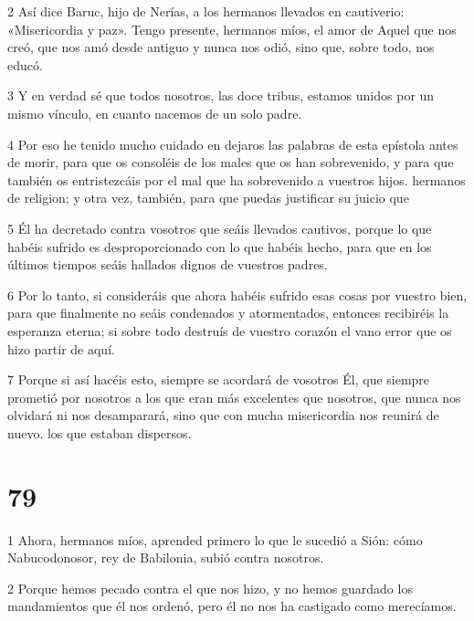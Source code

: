 \par 2 Así dice Baruc, hijo de Nerías, a los hermanos llevados en cautiverio: «Misericordia y paz». Tengo presente, hermanos míos, el amor de Aquel que nos creó, que nos amó desde antiguo y nunca nos odió, sino que, sobre todo, nos educó.

\par 3 Y en verdad sé que todos nosotros, las doce tribus, estamos unidos por un mismo vínculo, en cuanto nacemos de un solo padre.

\par 4 Por eso he tenido mucho cuidado en dejaros las palabras de esta epístola antes de morir, para que os consoléis de los males que os han sobrevenido, y para que también os entristezcáis por el mal que ha sobrevenido a vuestros hijos. hermanos de religion; y otra vez, también, para que puedas justificar su juicio que

\par 5 Él ha decretado contra vosotros que seáis llevados cautivos, porque lo que habéis sufrido es desproporcionado con lo que habéis hecho, para que en los últimos tiempos seáis hallados dignos de vuestros padres.

\par 6 Por lo tanto, si consideráis que ahora habéis sufrido esas cosas por vuestro bien, para que finalmente no seáis condenados y atormentados, entonces recibiréis la esperanza eterna; si sobre todo destruís de vuestro corazón el vano error que os hizo partir de aquí.

\par 7 Porque si así hacéis esto, siempre se acordará de vosotros Él, que siempre prometió por nosotros a los que eran más excelentes que nosotros, que nunca nos olvidará ni nos desamparará, sino que con mucha misericordia nos reunirá de nuevo. los que estaban dispersos.

\chapter{79}

\par 1 Ahora, hermanos míos, aprended primero lo que le sucedió a Sión: cómo Nabucodonosor, rey de Babilonia, subió contra nosotros.

\par 2 Porque hemos pecado contra el que nos hizo, y no hemos guardado los mandamientos que él nos ordenó, pero él no nos ha castigado como merecíamos.

